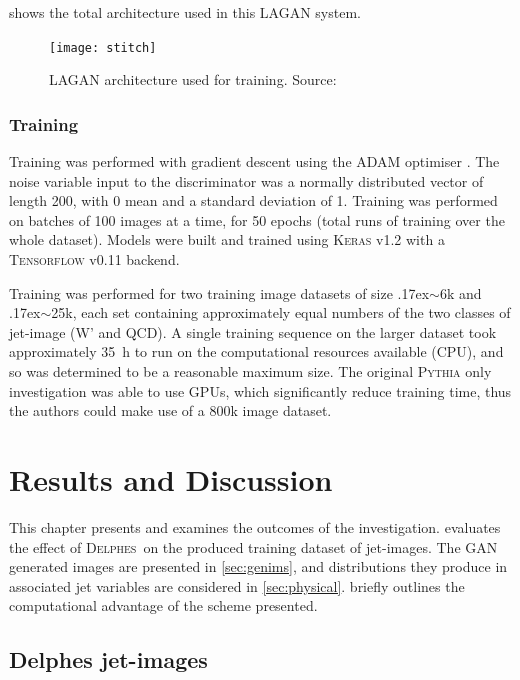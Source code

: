 \documentclass[twocolumn,twoside]{article}
\newcommand{\pkg}[1]{\textsc{#1}}
\newcommand{\delphes}{\pkg{Delphes}}
\newcommand{\around}{{\raise.17ex\hbox{$\scriptstyle\sim$}}}
\begin{document}
 shows the total architecture used in this LAGAN system. 
\begin{figure}[H]
	\centering
	\texttt{[image: stitch]}
	
	\caption{LAGAN architecture used for training. Source: \cite{de2017learning}}
	\label{fig:stitch}
	
\end{figure}   

\subsubsection{Training}
\label{sec:training}
Training was performed with gradient descent using the ADAM optimiser \cite{adam}. The noise variable input to the discriminator was a normally distributed vector of length 200, with 0 mean and a standard deviation of 1. Training was performed on batches of 100 images at a time, for 50 epochs (total runs of training over the whole dataset). Models were built and trained using \pkg{Keras} v1.2 \cite{keras} with a \pkg{Tensorflow} v0.11 \cite{tensorflow} backend.

Training was performed for two training image datasets of size \around6k and \around25k, each set containing approximately equal numbers of the two classes of jet-image (W' and QCD). A single training sequence on the larger dataset took approximately \SI{35}{\hour} to run on the computational resources available (CPU), and so was determined to be a reasonable maximum size. The original \pkg{Pythia} only investigation was able to use GPUs, which significantly reduce training time, thus the authors could make use of a 800k image dataset.


\section{Results and Discussion}
\label{sec:results}

This chapter presents and examines the outcomes of the investigation.  evaluates the effect of \delphes~on the produced training dataset of jet-images. The GAN generated images are presented in \cref{sec:genims}, and distributions they produce in associated jet variables are considered in \cref{sec:physical}.  briefly outlines the computational advantage of the scheme presented.

\subsection{Delphes jet-images}
\label{sec:delphes-ims}
\end{document}
